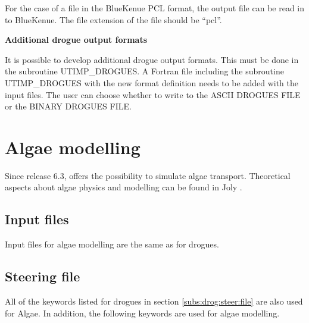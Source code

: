  For the case of a file in the BlueKenue PCL format, the output file can be read in to BlueKenue.  The file extension of the file should be “pcl”.
 
 \textbf{Additional drogue output formats}

 It is possible to develop additional drogue output formats.  This must be done in the subroutine UTIMP\_DROGUES.  A Fortran file including the subroutine UTIMP\_DROGUES with the new format definition needs to be added with the input files.  The user can choose whether to write to the ASCII DROGUES FILE or the BINARY DROGUES FILE.

\section{ Algae modelling}
\label{sec:algae:bloom}
 Since release 6.3,  offers the possibility to simulate algae transport. Theoretical aspects about algae physics and modelling can be found in Joly \cite{Joly2011}.


\subsection{ Input files}

 Input files for algae modelling are the same as for drogues.


\subsection{ Steering file}

 All of the keywords listed for drogues in section \ref{subs:drog:steer:file} are also used for Algae.  In addition, the following keywords are used for algae modelling.

